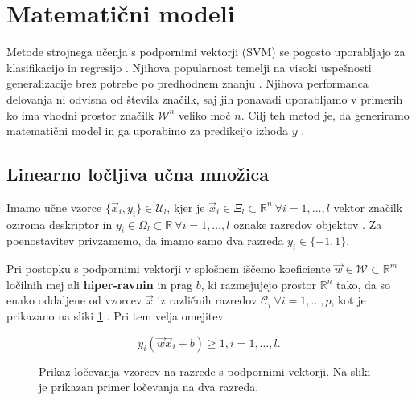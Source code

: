 \section{Matematični modeli}\label{sec:matematicni-modeli}
Metode strojnega učenja s podpornimi vektorji (SVM) se pogosto uporabljajo za klasifikacijo in regresijo \cite{chang2011a}. Njihova popularnost temelji na visoki uspešnosti generalizacije brez potrebe po predhodnem znanju \cite{chapelle1999support}. Njihova performanca delovanja ni odvisna od števila značilk, saj jih ponavadi uporabljamo v primerih ko ima vhodni prostor značilk $\mathcal{W}^n$ veliko moč $n$. Cilj teh metod je, da generiramo matematični model in ga uporabimo za predikcijo izhoda $y$ \cite{hsu2003practical}. 








\subsection{Linearno ločljiva učna množica}
Imamo učne vzorce $\{ \vec{x}_i, y_i \} \in \mathcal{U}_l$, kjer je $\vec{x}_i \in \mathcal{\Xi}_l \subset \mathbb{R}^n~\forall i = 1, \ldots, l$ vektor značilk oziroma deskriptor in $y_i \in \mathit{\Omega}_l \subset \mathbb{R}~\forall i = 1, \ldots, l$ oznake razredov objektov \cite{chapelle1999support}. Za poenostavitev privzamemo, da imamo samo dva razreda $y_i \in \{-1,1\}$. 

Pri postopku s podpornimi vektorji v splošnem iščemo koeficiente $\vec{w} \in \mathcal{W} \subset \mathbb{R}^m$ ločilnih mej ali \textbf{hiper-ravnin} in prag $b$, ki razmejujejo prostor $\mathbb{R}^n$ tako, da so enako oddaljene od vzorcev $\vec{x}$ iz različnih razredov $\mathcal{C}_i~\forall i= 1, \ldots, p$, kot je prikazano na sliki \ref{fig:svm-locljivo} \cite{chapelle1999support}. Pri tem velja omejitev

\begin{equation}\label{eq:omejitev-ravnine}
	y_i(\vec{w} \vec{x}_i + b) \geq 1, i=1, \ldots, l.
\end{equation}





\begin{figure}[htb]
\centering

\caption[Prikaz ločevanja vzorcev na razrede s podpornimi vektorji]{Prikaz ločevanja vzorcev na razrede s podpornimi vektorji. Na sliki je prikazan primer ločevanja na dva razreda.}
\label{fig:svm-locljivo}
\end{figure}




